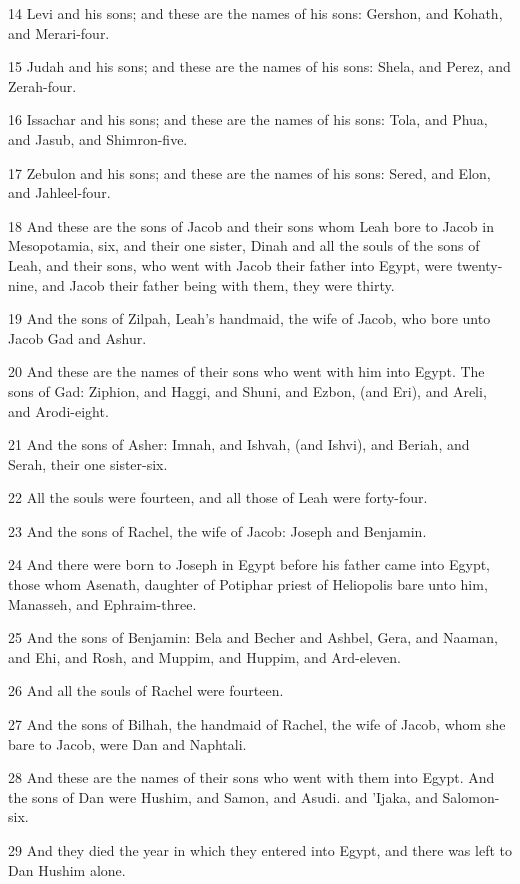 \par 14 Levi and his sons; and these are the names of his sons: Gershon, and Kohath, and Merari-four.
\par 15 Judah and his sons; and these are the names of his sons: Shela, and Perez, and Zerah-four.
\par 16 Issachar and his sons; and these are the names of his sons: Tola, and Phua, and Jasub, and Shimron-five.
\par 17 Zebulon and his sons; and these are the names of his sons: Sered, and Elon, and Jahleel-four.
\par 18 And these are the sons of Jacob and their sons whom Leah bore to Jacob in Mesopotamia, six, and their one sister, Dinah and all the souls of the sons of Leah, and their sons, who went with Jacob their father into Egypt, were twenty-nine, and Jacob their father being with them, they were thirty.
\par 19 And the sons of Zilpah, Leah's handmaid, the wife of Jacob, who bore unto Jacob Gad and Ashur.
\par 20 And these are the names of their sons who went with him into Egypt. The sons of Gad: Ziphion, and Haggi, and Shuni, and Ezbon, (and Eri), and Areli, and Arodi-eight.
\par 21 And the sons of Asher: Imnah, and Ishvah, (and Ishvi), and Beriah, and Serah, their one sister-six.
\par 22 All the souls were fourteen, and all those of Leah were forty-four.
\par 23 And the sons of Rachel, the wife of Jacob: Joseph and Benjamin.
\par 24 And there were born to Joseph in Egypt before his father came into Egypt, those whom Asenath, daughter of Potiphar priest of Heliopolis bare unto him, Manasseh, and Ephraim-three.
\par 25 And the sons of Benjamin: Bela and Becher and Ashbel, Gera, and Naaman, and Ehi, and Rosh, and Muppim, and Huppim, and Ard-eleven.
\par 26 And all the souls of Rachel were fourteen.
\par 27 And the sons of Bilhah, the handmaid of Rachel, the wife of Jacob, whom she bare to Jacob, were Dan and Naphtali.
\par 28 And these are the names of their sons who went with them into Egypt. And the sons of Dan were Hushim, and Samon, and Asudi. and 'Ijaka, and Salomon-six.
\par 29 And they died the year in which they entered into Egypt, and there was left to Dan Hushim alone.
